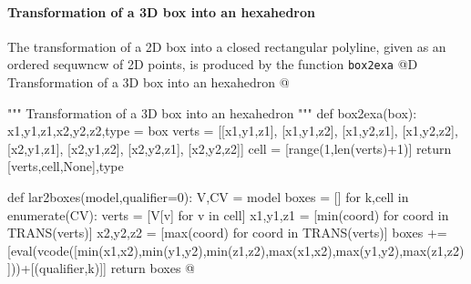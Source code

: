 \documentclass[11pt,oneside]{article}    %
\begin{document}
    
\paragraph{Transformation of a 3D box into an hexahedron}
The transformation of a 2D box into a closed rectangular polyline, given as an ordered sequwncw of 2D points, is produced by the function \texttt{box2exa}
@D Transformation of a 3D box into an hexahedron
@{""" Transformation of a 3D box into an hexahedron """    
def box2exa(box):
    x1,y1,z1,x2,y2,z2,type = box
    verts = [[x1,y1,z1], [x1,y1,z2], [x1,y2,z1], [x1,y2,z2], [x2,y1,z1], [x2,y1,z2], [x2,y2,z1], [x2,y2,z2]]
    cell = [range(1,len(verts)+1)]
    return [verts,cell,None],type

def lar2boxes(model,qualifier=0):
    V,CV = model
    boxes = []
    for k,cell in enumerate(CV):
        verts = [V[v] for v in cell]
        x1,y1,z1 = [min(coord) for coord in TRANS(verts)]
        x2,y2,z2 = [max(coord) for coord in TRANS(verts)]
        boxes += [eval(vcode([min(x1,x2),min(y1,y2),min(z1,z2),max(x1,x2),max(y1,y2),max(z1,z2)]))+[(qualifier,k)]]
    return boxes
@}



\end{document}
